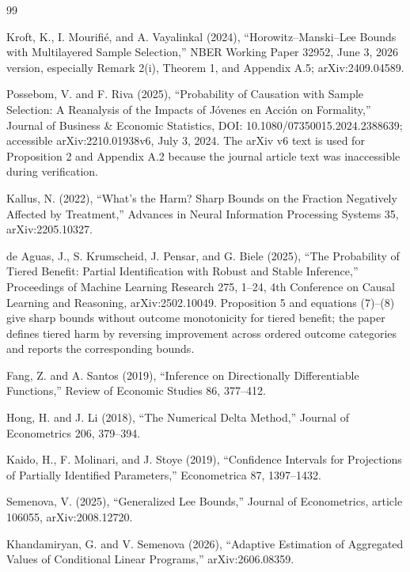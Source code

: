 \documentclass{article}
\begin{document}
\begin{thebibliography}{99}

   Kroft, K., I. Mourifi\'e, and A. Vayalinkal (2024), ``Horowitz--Manski--Lee Bounds with Multilayered Sample Selection,'' NBER Working Paper 32952, June 3, 2026 version, especially Remark 2(i), Theorem 1, and Appendix A.5; arXiv:2409.04589.

   Possebom, V. and F. Riva (2025), ``Probability of Causation with Sample Selection: A Reanalysis of the Impacts of J\'ovenes en Acci\'on on Formality,'' Journal of Business \& Economic Statistics, DOI: 10.1080/07350015.2024.2388639; accessible arXiv:2210.01938v6, July 3, 2024. The arXiv v6 text is used for Proposition 2 and Appendix A.2 because the journal article text was inaccessible during verification.

   Kallus, N. (2022), ``What's the Harm? Sharp Bounds on the Fraction Negatively Affected by Treatment,'' Advances in Neural Information Processing Systems 35, arXiv:2205.10327.

   de Aguas, J., S. Krumscheid, J. Pensar, and G. Biele (2025), ``The Probability of Tiered Benefit: Partial Identification with Robust and Stable Inference,'' Proceedings of Machine Learning Research 275, 1--24, 4th Conference on Causal Learning and Reasoning, arXiv:2502.10049. Proposition 5 and equations (7)--(8) give sharp bounds without outcome monotonicity for tiered benefit; the paper defines tiered harm by reversing improvement across ordered outcome categories and reports the corresponding bounds.

   Fang, Z. and A. Santos (2019), ``Inference on Directionally Differentiable Functions,'' Review of Economic Studies 86, 377--412.

   Hong, H. and J. Li (2018), ``The Numerical Delta Method,'' Journal of Econometrics 206, 379--394.

   Kaido, H., F. Molinari, and J. Stoye (2019), ``Confidence Intervals for Projections of Partially Identified Parameters,'' Econometrica 87, 1397--1432.

   Semenova, V. (2025), ``Generalized Lee Bounds,'' Journal of Econometrics, article 106055, arXiv:2008.12720.

   Khandamiryan, G. and V. Semenova (2026), ``Adaptive Estimation of Aggregated Values of Conditional Linear Programs,'' arXiv:2606.08359.


\end{thebibliography}
\end{document}
